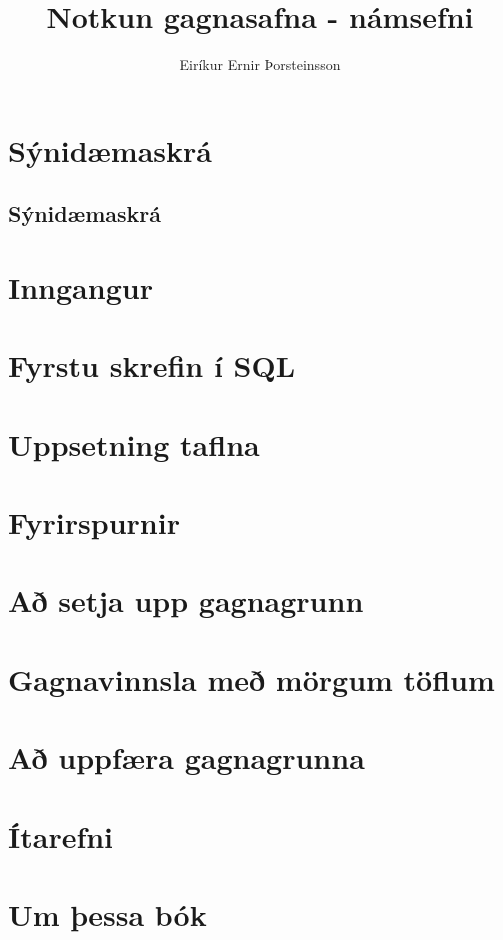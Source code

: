 \documentclass[nohyper, notoc, justified, openany]{tufte-book}
\author{Eiríkur Ernir Þorsteinsson}
\title{Notkun gagnasafna - námsefni}
\date{}
\makeatletter
\newcounter{example}[chapter]
\newcommand\listexamplename{Sýnidæmaskrá}
\newcommand\listofexamples{%
  \ifthenelse{\equal{\@tufte@class}{book}}%
    {\chapter*{\listexamplename}}%
    {\section*{\listexamplename}}%
    \@starttoc{loe}%
}
\makeatother
\begin{document}
\setcounter{tocdepth}{2}
\setcounter{secnumdepth}{1}

\maketitle

\tableofcontents
\listoffigures
\listoftables
\listofexamples

\newpage

\chapter{Inngangur}
\label{kafli:inngangur}


\chapter{Fyrstu skrefin í SQL}
\label{kafli:fyrstuskrefin}


\chapter{Uppsetning taflna}
\label{kafli:uppsetningtaflna}


\chapter{Fyrirspurnir}
\label{kafli:select}


\chapter{Að setja upp gagnagrunn}
\label{kafli:uppsetninggagnagrunns}


\chapter{Gagnavinnsla með mörgum töflum}
\label{kafli:gagnavinnslamargartoflur}


\chapter{Að uppfæra gagnagrunna}
\label{kafli:uppfaera}


\chapter{Ítarefni}
\label{kafli:itarefni}


\chapter{Um þessa bók}
\label{kafli:um-bokina}

\end{document}
